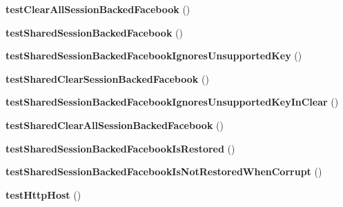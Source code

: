 \begin{DoxyCompactItemize}
\item 
\hypertarget{class_p_h_p_s_d_k_test_case_abab28b812ba7022bdae7770ac35efe14}{{\bfseries test\-Clear\-All\-Session\-Backed\-Facebook} ()}\label{class_p_h_p_s_d_k_test_case_abab28b812ba7022bdae7770ac35efe14}

\item 
\hypertarget{class_p_h_p_s_d_k_test_case_a6da4d6efda88f177e29513d65c9303ef}{{\bfseries test\-Shared\-Session\-Backed\-Facebook} ()}\label{class_p_h_p_s_d_k_test_case_a6da4d6efda88f177e29513d65c9303ef}

\item 
\hypertarget{class_p_h_p_s_d_k_test_case_a4f0b5b3aceb07510c5cc56e0068804a7}{{\bfseries test\-Shared\-Session\-Backed\-Facebook\-Ignores\-Unsupported\-Key} ()}\label{class_p_h_p_s_d_k_test_case_a4f0b5b3aceb07510c5cc56e0068804a7}

\item 
\hypertarget{class_p_h_p_s_d_k_test_case_a3af0e4215c78342e4f9cd698834ba338}{{\bfseries test\-Shared\-Clear\-Session\-Backed\-Facebook} ()}\label{class_p_h_p_s_d_k_test_case_a3af0e4215c78342e4f9cd698834ba338}

\item 
\hypertarget{class_p_h_p_s_d_k_test_case_a6559a5c84683514316177d1b5a14d7b5}{{\bfseries test\-Shared\-Session\-Backed\-Facebook\-Ignores\-Unsupported\-Key\-In\-Clear} ()}\label{class_p_h_p_s_d_k_test_case_a6559a5c84683514316177d1b5a14d7b5}

\item 
\hypertarget{class_p_h_p_s_d_k_test_case_a698f8e76fdc1de99cbb401b77041ee9f}{{\bfseries test\-Shared\-Clear\-All\-Session\-Backed\-Facebook} ()}\label{class_p_h_p_s_d_k_test_case_a698f8e76fdc1de99cbb401b77041ee9f}

\item 
\hypertarget{class_p_h_p_s_d_k_test_case_a6a9b6dda2ba56c39de677d640ae1db48}{{\bfseries test\-Shared\-Session\-Backed\-Facebook\-Is\-Restored} ()}\label{class_p_h_p_s_d_k_test_case_a6a9b6dda2ba56c39de677d640ae1db48}

\item 
\hypertarget{class_p_h_p_s_d_k_test_case_a0f274983cde8f858e392006bb248cd55}{{\bfseries test\-Shared\-Session\-Backed\-Facebook\-Is\-Not\-Restored\-When\-Corrupt} ()}\label{class_p_h_p_s_d_k_test_case_a0f274983cde8f858e392006bb248cd55}

\item 
\hypertarget{class_p_h_p_s_d_k_test_case_a70591cce8c5ddba5f9c9b28e97b60518}{{\bfseries test\-Http\-Host} ()}\label{class_p_h_p_s_d_k_test_case_a70591cce8c5ddba5f9c9b28e97b60518}


\end{DoxyCompactItemize}
